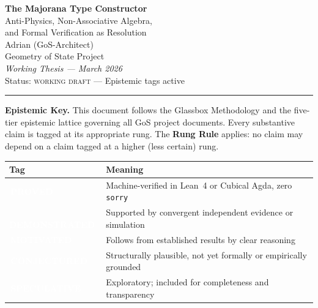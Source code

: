 \documentclass[11pt,letterpaper]{article}
\newcommand{\proved}{\texorpdfstring{\colorbox{proved}{\textcolor{white}{\scriptsize\textbf{\,PROVED\,}}}}{ [PROVED]}}
\newcommand{\demonstrated}{\texorpdfstring{\colorbox{demonstrated}{\textcolor{white}{\scriptsize\textbf{\,DEMONSTRATED\,}}}}{ [DEMONSTRATED]}}
\newcommand{\motivated}{\texorpdfstring{\colorbox{motivated}{\textcolor{white}{\scriptsize\textbf{\,MOTIVATED\,}}}}{ [MOTIVATED]}}
\newcommand{\conjectured}{\texorpdfstring{\colorbox{conjectured}{\textcolor{white}{\scriptsize\textbf{\,CONJECTURED\,}}}}{ [CONJECTURED]}}
\newcommand{\speculative}{\texorpdfstring{\colorbox{speculative}{\textcolor{white}{\scriptsize\textbf{\,SPECULATIVE\,}}}}{ [SPECULATIVE]}}
\begin{document}

\begin{center}
  {\LARGE\bfseries The Majorana Type Constructor}\\[8pt]
  {\large Anti-Physics, Non-Associative Algebra,\\
  and Formal Verification as Resolution}\\[16pt]
  {\normalsize Adrian (GoS-Architect)}\\[4pt]
  {\small Geometry of State Project}\\[4pt]
  {\small\textit{Working Thesis --- March 2026}}\\[4pt]
  {\small Status: \textsc{working draft} --- Epistemic tags active}
\end{center}

\vspace{8pt}
\hrule
\vspace{12pt}


\noindent\textbf{Epistemic Key.}\quad
This document follows the Glassbox Methodology and the five-tier epistemic lattice governing all GoS project documents. Every substantive claim is tagged at its appropriate rung. The \textbf{Rung Rule} applies: no claim may depend on a claim tagged at a higher (less certain) rung.

\medskip

\begin{center}
\begin{tabular}{>{\centering}m{2.5cm} p{10cm}}
\toprule
\textbf{Tag} & \textbf{Meaning} \\
\midrule
\proved & Machine-verified in Lean~4 or Cubical Agda, zero \texttt{sorry} \\[4pt]
\demonstrated & Supported by convergent independent evidence or simulation \\[4pt]
\motivated & Follows from established results by clear reasoning \\[4pt]
\conjectured & Structurally plausible, not yet formally or empirically grounded \\[4pt]
\speculative & Exploratory; included for completeness and transparency \\
\bottomrule
\end{tabular}
\end{center}
\end{document}
